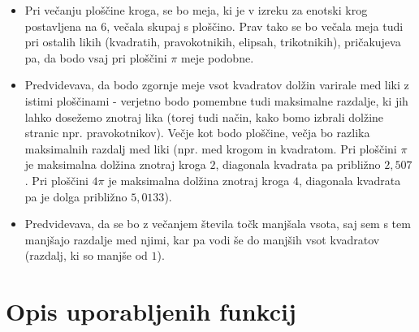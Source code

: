 \documentclass[a4paper]{report}
\begin{document}
\begin{itemize}
\item Pri večanju ploščine kroga, se bo meja, ki je v izreku za enotski krog postavljena na $6$, večala skupaj s ploščino. Prav tako se bo večala meja tudi pri ostalih likih (kvadratih, pravokotnikih, elipsah, trikotnikih), pričakujeva pa, da bodo vsaj pri ploščini $\pi$ meje podobne. 
\item Predvidevava, da bodo zgornje meje vsot kvadratov dolžin varirale med liki z istimi ploščinami - verjetno bodo pomembne tudi maksimalne razdalje, ki jih lahko dosežemo znotraj lika (torej tudi način, kako bomo izbrali dolžine stranic npr. pravokotnikov). Večje kot bodo ploščine, večja bo razlika maksimalnih razdalj med liki (npr. med krogom in kvadratom. Pri ploščini $\pi$ je maksimalna dolžina znotraj kroga $2$, diagonala kvadrata pa približno $2,507$. Pri ploščini $4\pi$ je maksimalna dolžina znotraj kroga $4$, diagonala kvadrata pa je dolga približno $5,0133$). 
\item Predvidevava, da se bo z večanjem števila točk manjšala vsota, saj sem s tem manjšajo razdalje med njimi, kar pa vodi še do manjših vsot kvadratov (razdalj, ki so manjše od $1$).
\end{itemize}


\section{Opis uporabljenih funkcij}
\end{document}
